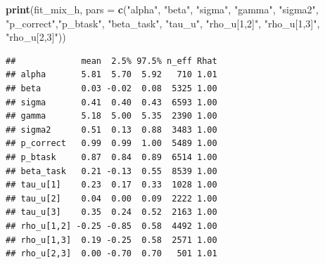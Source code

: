 \documentclass[12pt,]{krantz}
\newenvironment{Shaded}{\begin{snugshade}}{\end{snugshade}}
\newcommand{\KeywordTok}[1]{\textcolor[rgb]{0.13,0.29,0.53}{\textbf{#1}}}
\newcommand{\DataTypeTok}[1]{\textcolor[rgb]{0.13,0.29,0.53}{#1}}
\newcommand{\StringTok}[1]{\textcolor[rgb]{0.31,0.60,0.02}{#1}}
\newcommand{\OperatorTok}[1]{\textcolor[rgb]{0.81,0.36,0.00}{\textbf{#1}}}
\newcommand{\NormalTok}[1]{#1}
\theoremstyle{definition}
\theoremstyle{definition}
\theoremstyle{definition}
\theoremstyle{remark}
\begin{document}
\begin{Shaded}
\end{Shaded}

\begin{Shaded}
\begin{Highlighting}[]
\KeywordTok{print}\NormalTok{(fit_mix_h, }\DataTypeTok{pars =} \KeywordTok{c}\NormalTok{(}\StringTok{"alpha"}\NormalTok{, }\StringTok{"beta"}\NormalTok{, }\StringTok{"sigma"}\NormalTok{, }\StringTok{"gamma"}\NormalTok{, }\StringTok{"sigma2"}\NormalTok{,}
                          \StringTok{"p_correct"}\NormalTok{,}\StringTok{"p_btask"}\NormalTok{, }\StringTok{"beta_task"}\NormalTok{, }\StringTok{"tau_u"}\NormalTok{,}
                          \StringTok{"rho_u[1,2]"}\NormalTok{, }\StringTok{"rho_u[1,3]"}\NormalTok{, }\StringTok{"rho_u[2,3]"}\NormalTok{))}
\end{Highlighting}
\end{Shaded}

\begin{verbatim}
##             mean  2.5% 97.5% n_eff Rhat
## alpha       5.81  5.70  5.92   710 1.01
## beta        0.03 -0.02  0.08  5325 1.00
## sigma       0.41  0.40  0.43  6593 1.00
## gamma       5.18  5.00  5.35  2390 1.00
## sigma2      0.51  0.13  0.88  3483 1.00
## p_correct   0.99  0.99  1.00  5489 1.00
## p_btask     0.87  0.84  0.89  6514 1.00
## beta_task   0.21 -0.13  0.55  8539 1.00
## tau_u[1]    0.23  0.17  0.33  1028 1.00
## tau_u[2]    0.04  0.00  0.09  2222 1.00
## tau_u[3]    0.35  0.24  0.52  2163 1.00
## rho_u[1,2] -0.25 -0.85  0.58  4492 1.00
## rho_u[1,3]  0.19 -0.25  0.58  2571 1.00
## rho_u[2,3]  0.00 -0.70  0.70   501 1.01
\end{verbatim}
\end{document}
